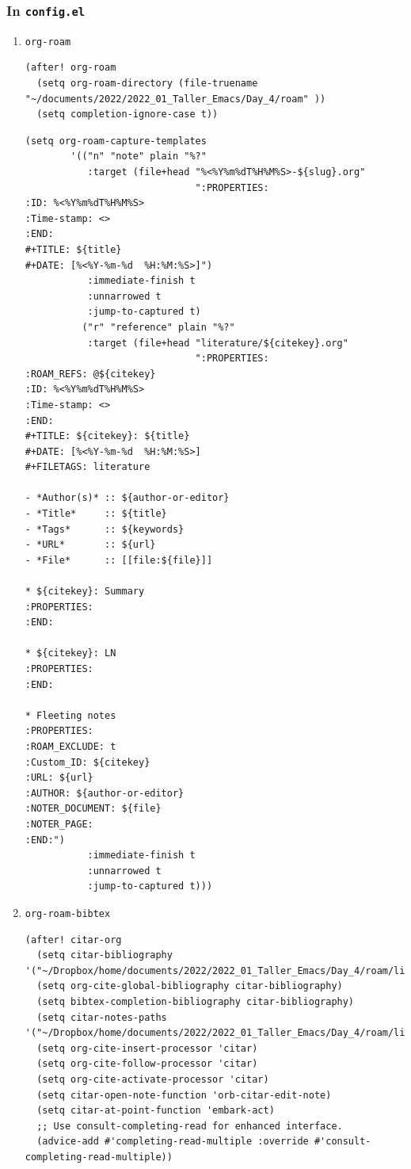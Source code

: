 \documentclass[11pt]{article}
\begin{document}
\subsubsection{In \texttt{config.el}}
\label{sec:org67ab3c1}
\begin{enumerate}
\item \texttt{org-roam}
\label{sec:org76e31b6}
\begin{verbatim}
(after! org-roam
  (setq org-roam-directory (file-truename "~/documents/2022/2022_01_Taller_Emacs/Day_4/roam" ))
  (setq completion-ignore-case t))
\end{verbatim}

\begin{verbatim}
(setq org-roam-capture-templates
        '(("n" "note" plain "%?"
           :target (file+head "%<%Y%m%dT%H%M%S>-${slug}.org"
                              ":PROPERTIES:
:ID: %<%Y%m%dT%H%M%S>
:Time-stamp: <>
:END:
#+TITLE: ${title}
#+DATE: [%<%Y-%m-%d  %H:%M:%S>]")
           :immediate-finish t
           :unnarrowed t
           :jump-to-captured t)
          ("r" "reference" plain "%?"
           :target (file+head "literature/${citekey}.org"
                              ":PROPERTIES:
:ROAM_REFS: @${citekey}
:ID: %<%Y%m%dT%H%M%S>
:Time-stamp: <>
:END:
#+TITLE: ${citekey}: ${title}
#+DATE: [%<%Y-%m-%d  %H:%M:%S>]
#+FILETAGS: literature

- *Author(s)* :: ${author-or-editor}
- *Title*     :: ${title}
- *Tags*      :: ${keywords}
- *URL*       :: ${url}
- *File*      :: [[file:${file}]]

* ${citekey}: Summary
:PROPERTIES:
:END:

* ${citekey}: LN
:PROPERTIES:
:END:

* Fleeting notes
:PROPERTIES:
:ROAM_EXCLUDE: t
:Custom_ID: ${citekey}
:URL: ${url}
:AUTHOR: ${author-or-editor}
:NOTER_DOCUMENT: ${file}
:NOTER_PAGE:
:END:")
           :immediate-finish t
           :unnarrowed t
           :jump-to-captured t)))
\end{verbatim}


\item \texttt{org-roam-bibtex}
\label{sec:orge856efa}
\begin{verbatim}
(after! citar-org
  (setq citar-bibliography '("~/Dropbox/home/documents/2022/2022_01_Taller_Emacs/Day_4/roam/library.bib"))
  (setq org-cite-global-bibliography citar-bibliography)
  (setq bibtex-completion-bibliography citar-bibliography)
  (setq citar-notes-paths '("~/Dropbox/home/documents/2022/2022_01_Taller_Emacs/Day_4/roam/literature/"))
  (setq org-cite-insert-processor 'citar)
  (setq org-cite-follow-processor 'citar)
  (setq org-cite-activate-processor 'citar)
  (setq citar-open-note-function 'orb-citar-edit-note)
  (setq citar-at-point-function 'embark-act)
  ;; Use consult-completing-read for enhanced interface.
  (advice-add #'completing-read-multiple :override #'consult-completing-read-multiple))


\end{verbatim}
\end{enumerate}
\end{document}
